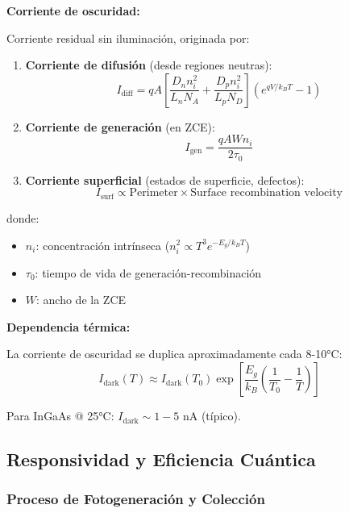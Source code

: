 \documentclass[11pt,a4paper]{article}
\begin{document}
\textbf{Corriente de oscuridad:}

Corriente residual sin iluminación, originada por:
\begin{enumerate}
    \item \textbf{Corriente de difusión} (desde regiones neutras):
    \begin{equation}
        I_{\text{diff}} = qA\left[\frac{D_n n_i^2}{L_n N_A} + \frac{D_p n_i^2}{L_p N_D}\right](e^{qV/k_BT} - 1)
    \end{equation}
    
    \item \textbf{Corriente de generación} (en ZCE):
    \begin{equation}
        I_{\text{gen}} = \frac{qAW n_i}{2\tau_0}
    \end{equation}
    
    \item \textbf{Corriente superficial} (estados de superficie, defectos):
    \begin{equation}
        I_{\text{surf}} \propto \text{Perimeter} \times \text{Surface recombination velocity}
    \end{equation}
\end{enumerate}

donde:
\begin{itemize}
    \item $n_i$: concentración intrínseca ($n_i^2 \propto T^3 e^{-E_g/k_BT}$)
    \item $\tau_0$: tiempo de vida de generación-recombinación
    \item $W$: ancho de la ZCE
\end{itemize}

\textbf{Dependencia térmica:}

La corriente de oscuridad se duplica aproximadamente cada 8-10°C:
\begin{equation}
    I_{\text{dark}}(T) \approx I_{\text{dark}}(T_0)\exp\left[\frac{E_g}{k_B}\left(\frac{1}{T_0} - \frac{1}{T}\right)\right]
\end{equation}

Para InGaAs @ 25°C: $I_{\text{dark}} \sim 1-5$ nA (típico).

\subsection{Responsividad y Eficiencia Cuántica}

\subsubsection{Proceso de Fotogeneración y Colección}
\end{document}

